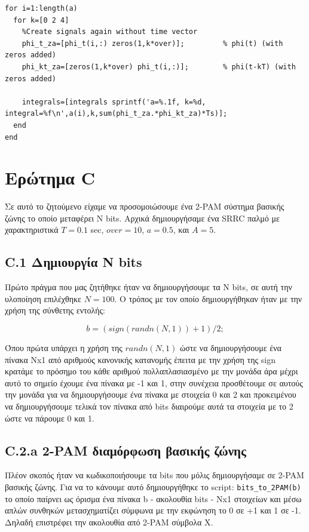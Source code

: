 \documentclass[11pt]{article}
\begin{document}
\begin{lstlisting}[caption = {B.1.3}]
for i=1:length(a)
  for k=[0 2 4]
    %Create signals again without time vector
    phi_t_za=[phi_t(i,:) zeros(1,k*over)];         % phi(t) (with zeros added)
    phi_kt_za=[zeros(1,k*over) phi_t(i,:)];        % phi(t-kT) (with zeros added)
  
    integrals=[integrals sprintf('a=%.1f, k=%d, integral=%f\n',a(i),k,sum(phi_t_za.*phi_kt_za)*Ts)];
  end
end
\end{lstlisting}

    \section{Ερώτημα C}
    Σε αυτό το ζητούμενο είχαμε να προσομοιώσουμε ένα 2-PAM σύστημα βασικής ζώνης το οποίο μεταφέρει N bits. Αρχικά δημιουργήσαμε ένα SRRC παλμό με χαρακτηριστικά $T=0.1$ sec, $over=10$, $a=0.5$, και $A=5$.
    
    \subsection*{C.1 Δημιουργία N bits}
    Πρώτο πράγμα που μας ζητήθηκε ήταν να δημιουργήσουμε τα Ν bits, σε αυτή την υλοποίηση επιλέχθηκε $Ν = 100$. Ο τρόπος με τον οποίο δημιουργήθηκαν ήταν με την χρήση της σύνθετης εντολής: 
    
    $$b = (sign(randn(N, 1)) + 1)/2;$$
    
    \par \noindent
    Όπου πρώτα υπάρχει η χρήση της $randn(N,1)$ ώστε να δημιουργήσουμε ένα πίνακα Nx1 από αριθμούς κανονικής κατανομής έπειτα με την χρήση της sign κρατάμε το πρόσημο του κάθε αριθμού πολλαπλασιασμένο με την μονάδα άρα μέχρι αυτό το σημείο έχουμε ένα πίνακα με -1 και 1, στην συνέχεια προσθέτουμε σε αυτούς την μονάδα για να δημιουργήσουμε ένα πίνακα με στοιχεία 0 και 2 και προκειμένου να δημιουργήσουμε τελικά τον πίνακα από bits διαιρούμε αυτά τα στοιχεία με το 2 ώστε να πάρουμε 0 και 1.


    \subsection*{C.2.a 2-PAM διαμόρφωση βασικής ζώνης}
    Πλέον σκοπός ήταν να κωδικοποιήσουμε τα bits που μόλις δημιουργήσαμε σε 2-PAM βασικής ζώνης. Για να το κάνουμε αυτό δημιουργήθηκε το script: \texttt{bits\_to\_2PAM(b)} το οποίο παίρνει ως όρισμα ένα πίνακα b - ακολουθία bits - Νx1 στοιχείων και μέσω απλών συνθηκών μετασχηματίζει σύμφωνα με την εκφώνηση το 0 σε +1 και 1 σε -1. Δηλαδή επιστρέφει την ακολουθία από 2-PAM σύμβολα X.
    
\end{document}
